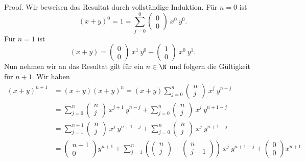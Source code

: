 \documentclass[letterpaper,10pt,english]{jupyterBook}
\begin{document}
\begin{emphBox}{}{}
Proof.  Wir beweisen das Resultat durch vollständige Induktion. Für \(n=0\) ist
\begin{equation*}
(x+y)^0 = 1 =  \sum_{j=0}^0 (\begin{matrix} 0\\0 \end{matrix} ) ~  x^0~ y^0 .
\end{equation*}
Für \(n=1\) ist
\begin{equation*}
 (x+y) = (\begin{matrix} 0\\0 \end{matrix} ) ~  x^1~ y^0 + (\begin{matrix} 1\\0 \end{matrix} ) ~  x^0~ y^1.
\end{equation*}
Nun nehmen wir an das Resultat gilt für ein \(n \in \N\) und folgern die Gültigkeit für \(n+1\).
Wir haben
\begin{align*}
(x+y)^{n+1} &= (x+y) (x+y)^n =  (x+y) \sum_{j=0}^n (\begin{matrix} n\\j \end{matrix} ) ~  x^j~ y^{n-j} \\
&=\sum_{j=0}^n (\begin{matrix} n\\j \end{matrix} ) ~  x^{j+1}~ y^{n-j} +\sum_{j=0}^n (\begin{matrix} n\\j \end{matrix} ) ~  x^j~ y^{n+1-j}  \\
&= \sum_{j=1}^{n+1} (\begin{matrix} n\\j \end{matrix} ) ~  x^{j}~ y^{n+1-j}  + \sum_{j=0}^n (\begin{matrix} n\\j \end{matrix} ) ~  x^j~ y^{n+1-j} \\
&= (\begin{matrix} n+1\\ 0 \end{matrix} ) y^{n+1}+ \sum_{j=1}^{n } \left( (\begin{matrix} n\\j \end{matrix} ) +  (\begin{matrix} n\\j-1 \end{matrix} ) \right) ~  x^{j}~ y^{n+1-j} + (\begin{matrix} 0\\ 0 \end{matrix} ) x^{n+1}

\end{align*}
\end{emphBox}
\end{document}
